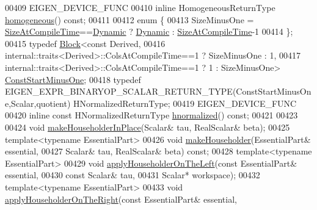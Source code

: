 \begin{DoxyCode}
00409     EIGEN\_DEVICE\_FUNC
00410     \textcolor{keyword}{inline} HomogeneousReturnType \hyperlink{group___geometry___module_ga8cd24704519bf35e1724e1915d477a35}{homogeneous}() \textcolor{keyword}{const};
00411 
00412     \textcolor{keyword}{enum} \{
00413       SizeMinusOne = \hyperlink{group___core___module_a9784b8701c2d1c79fa8000e1b3ebdb8ba6af0829cb5fc7506d681b5d011846d17}{SizeAtCompileTime}==\hyperlink{namespace_eigen_ad81fa7195215a0ce30017dfac309f0b2}{Dynamic} ? 
      \hyperlink{namespace_eigen_ad81fa7195215a0ce30017dfac309f0b2}{Dynamic} : \hyperlink{group___core___module_a9784b8701c2d1c79fa8000e1b3ebdb8ba6af0829cb5fc7506d681b5d011846d17}{SizeAtCompileTime}-1
00414     \};
00415     \textcolor{keyword}{typedef} \hyperlink{group___core___module_class_eigen_1_1_block}{Block}<\textcolor{keyword}{const} Derived,
00416                   internal::traits<Derived>::ColsAtCompileTime==1 ? SizeMinusOne : 1,
00417                   internal::traits<Derived>::ColsAtCompileTime==1 ? 1 : SizeMinusOne> 
      \hyperlink{group___core___module_class_eigen_1_1_block}{ConstStartMinusOne};
00418     \textcolor{keyword}{typedef} EIGEN\_EXPR\_BINARYOP\_SCALAR\_RETURN\_TYPE(ConstStartMinusOne,Scalar,quotient) 
      HNormalizedReturnType;
00419     EIGEN\_DEVICE\_FUNC
00420     \textcolor{keyword}{inline} \textcolor{keyword}{const} HNormalizedReturnType \hyperlink{group___geometry___module_gad7e913733107a9a1b61bff95ec9c03dd}{hnormalized}() \textcolor{keyword}{const};
00421 
00423 
00424     \textcolor{keywordtype}{void} \hyperlink{group___core___module_aebf4bac7dffe2685ab93734fb776e817}{makeHouseholderInPlace}(Scalar& tau, RealScalar& beta);
00425     \textcolor{keyword}{template}<\textcolor{keyword}{typename} EssentialPart>
00426     \textcolor{keywordtype}{void} \hyperlink{group___core___module_a13291e900f7e81ddc6e5b8802f82092b}{makeHouseholder}(EssentialPart& essential,
00427                          Scalar& tau, RealScalar& beta) \textcolor{keyword}{const};
00428     \textcolor{keyword}{template}<\textcolor{keyword}{typename} EssentialPart>
00429     \textcolor{keywordtype}{void} \hyperlink{group___core___module_a8f2c8059ef3f04cfa0c73b4c012db855}{applyHouseholderOnTheLeft}(\textcolor{keyword}{const} EssentialPart& essential,
00430                                    \textcolor{keyword}{const} Scalar& tau,
00431                                    Scalar* workspace);
00432     \textcolor{keyword}{template}<\textcolor{keyword}{typename} EssentialPart>
00433     \textcolor{keywordtype}{void} \hyperlink{group___core___module_ab3e52262b41fa40e194dda245e0f9675}{applyHouseholderOnTheRight}(\textcolor{keyword}{const} EssentialPart& essential,

\end{DoxyCode}
